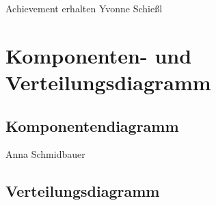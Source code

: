 \documentclass[a4paper, 12pt]{article}
\begin{document}
{\Large Achievement erhalten}
Yvonne Schießl
\begin{figure}[H] 
\centering
	\fbox{\begin{minipage}{16cm} 
	\end{minipage}}
\end{figure}

\section{Komponenten- und Verteilungsdiagramm}
\subsection{Komponentendiagramm}

Anna Schmidbauer
\begin{figure}[H] 
\centering
	\fbox{\begin{minipage}{16cm} 
	\end{minipage}}
\end{figure}

\subsection{Verteilungsdiagramm}
\end{document}
